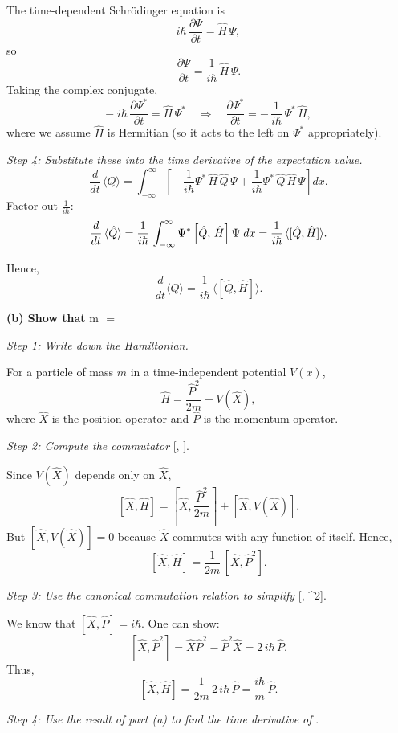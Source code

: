 \documentclass{article}
\begin{document}
The time-dependent Schr\"odinger equation is
\[
i\hbar\,\frac{\partial \Psi}{\partial t} = \hat{H}\,\Psi,
\]
so
\[
\frac{\partial \Psi}{\partial t} = \frac{1}{i\hbar}\,\hat{H}\,\Psi.
\]
Taking the complex conjugate,
\[
-\;i\hbar\,\frac{\partial \Psi^*}{\partial t} = \hat{H}\,\Psi^* 
\quad\Longrightarrow\quad
\frac{\partial \Psi^*}{\partial t} = -\,\frac{1}{i\hbar}\,\Psi^*\,\hat{H},
\]
where we assume \(\hat{H}\) is Hermitian (so it acts to the left on \(\Psi^*\) appropriately).

\textit{Step 4: Substitute these into the time derivative of the expectation value.}
\[
\frac{d}{dt}\,\langle \hat{Q} \rangle 
= \int_{-\infty}^{\infty} \left[ -\,\frac{1}{i\hbar} \Psi^*\,\hat{H}\,\hat{Q}\,\Psi 
+ \frac{1}{i\hbar} \Psi^*\,\hat{Q}\,\hat{H}\,\Psi \right] dx.
\]
Factor out \( \frac{1}{i\hbar} \):
\[
\frac{d}{dt}\,\langle \hat{Q} \rangle 
= \frac{1}{i\hbar}\,\int_{-\infty}^{\infty} \Psi^*\,\Bigl[\hat{Q},\,\hat{H}\Bigr]\,\Psi\;dx
= \frac{1}{i\hbar}\,\langle [\hat{Q}, \hat{H}] \rangle.
\]

Hence,
\[
\boxed{\frac{d}{dt} \langle \hat{Q} \rangle 
= \frac{1}{i\hbar}\,\langle [\hat{Q}, \hat{H}] \rangle.}
\]

\textbf{(b) Show that } \displaystyle m\,\,\langle {} \rangle = \langle {} \rangle

\textit{Step 1: Write down the Hamiltonian.}

For a particle of mass \(m\) in a time-independent potential \(V(x)\),
\[
\hat{H} = \frac{\hat{P}^2}{2m} + V(\hat{X}),
\]
where \(\hat{X}\) is the position operator and \(\hat{P}\) is the momentum operator.

\textit{Step 2: Compute the commutator } [, ].

Since \(V(\hat{X})\) depends only on \(\hat{X}\),
\[
[\hat{X}, \hat{H}] 
= \left[\hat{X}, \frac{\hat{P}^2}{2m}\right] + [\hat{X}, V(\hat{X})].
\]
But \([\hat{X}, V(\hat{X})] = 0\) because \(\hat{X}\) commutes with any function of itself. Hence,
\[
[\hat{X}, \hat{H}] = \frac{1}{2m}\,[\hat{X}, \hat{P}^2].
\]

\textit{Step 3: Use the canonical commutation relation to simplify } [, ^2].

We know that \([\hat{X}, \hat{P}] = i\hbar\). One can show:
\[
[\hat{X}, \hat{P}^2] 
= \hat{X}\hat{P}^2 - \hat{P}^2\hat{X}
= 2\,i\hbar\,\hat{P}.
\]
Thus,
\[
[\hat{X}, \hat{H}] 
= \frac{1}{2m}\,2\,i\hbar\,\hat{P} 
= \frac{i\hbar}{m}\,\hat{P}.
\]

\textit{Step 4: Use the result of part (a) to find the time derivative of } \langle {} \rangle.
\end{document}
